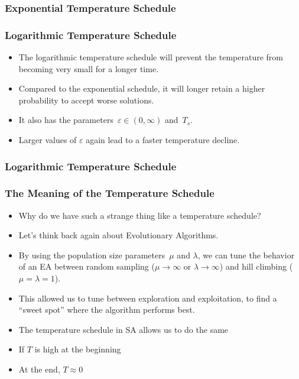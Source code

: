 \documentclass[mathserif]{beamer}%
\begin{document}
%
\begin{frame}%
\frametitle{Exponential Temperature Schedule}%
\end{frame}%
%
\begin{frame}%
\frametitle{Logarithmic Temperature Schedule}%
\begin{itemize}%
\item The \alert{logarithmic temperature schedule} will prevent the temperature from becoming very small for a longer time.%
\item<2-> Compared to the exponential schedule, it will longer retain a higher probability to accept worse solutions.%
\item<3-> It also has the parameters~$\varepsilon\in(0,\infty)$ and~$T_s$.
%
\item<5-> Larger values of $\varepsilon$ again lead to a faster temperature decline.%
\end{itemize}%
\end{frame}%
%
\begin{frame}%
\frametitle{Logarithmic Temperature Schedule}%
\end{frame}%
%
\begin{frame}%
\frametitle{The Meaning of the Temperature Schedule}%
\begin{itemize}%
\item Why do we have such a strange thing like a temperature schedule?%
\item<2-> Let's think back again about Evolutionary Algorithms\cite{WGOEB,H1975GA,BFM1997EA,MF2004HTSIMH,G1989GA}.%
\item<3-> By using the population size parameters~$\mu$ and $\lambda$, we can tune the behavior of an EA between random sampling ($\mu\rightarrow\infty$ or $\lambda\rightarrow\infty$) and hill climbing ($\mu=\lambda=1$).%
\item<4-> This allowed us to tune between exploration and exploitation, to find a ``sweet spot'' where the algorithm performs best.%
\item<5-> The temperature schedule in SA allows us to do the same%
\item<7-> If $T$ is high at the beginning%
\item<10-> At the end, $T\approx 0$%
\end{itemize}%
\end{frame}%
%
\end{document}
